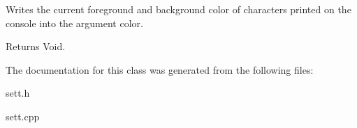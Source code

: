Writes the current foreground and background color of characters printed on the console into the argument color. 

\begin{DoxyReturn}{Returns}
Void. 
\end{DoxyReturn}


The documentation for this class was generated from the following files\+:\begin{DoxyCompactItemize}
\item 
sett.\+h\item 
sett.\+cpp\end{DoxyCompactItemize}
